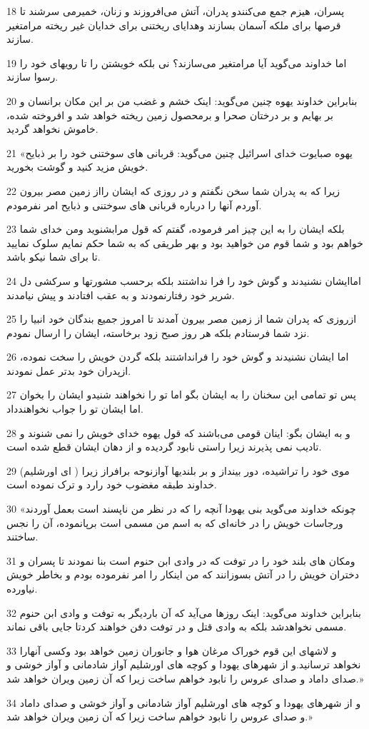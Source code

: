 \par 18 پسران، هیزم جمع می‌کنندو پدران، آتش می‌افروزند و زنان، خمیرمی سرشند تا قرصها برای ملکه آسمان بسازند وهدایای ریختنی برای خدایان غیر ریخته مرامتغیر سازند.
\par 19 اما خداوند می‌گوید آیا مرامتغیر می‌سازند؟ نی بلکه خویشتن را تا رویهای خود را رسوا سازند.
\par 20 بنابراین خداوند یهوه چنین می‌گوید: اینک خشم و غضب من بر این مکان برانسان و بر بهایم و بر درختان صحرا و برمحصول زمین ریخته خواهد شد و افروخته شده، خاموش نخواهد گردید.
\par 21 «یهوه صبایوت خدای اسرائیل چنین می‌گوید: قربانی های سوختنی خود را بر ذبایح خویش مزید کنید و گوشت بخورید.
\par 22 زیرا که به پدران شما سخن نگفتم و در روزی که ایشان رااز زمین مصر بیرون آوردم آنها را درباره قربانی های سوختنی و ذبایح امر نفرمودم.
\par 23 بلکه ایشان را به این چیز امر فرموده، گفتم که قول مرابشنوید ومن خدای شما خواهم بود و شما قوم من خواهید بود و بهر طریقی که به شما حکم نمایم سلوک نمایید تا برای شما نیکو باشد.
\par 24 اماایشان نشنیدند و گوش خود را فرا نداشتند بلکه برحسب مشورتها و سرکشی دل شریر خود رفتارنمودند و به عقب افتادند و پیش نیامدند.
\par 25 ازروزی که پدران شما از زمین مصر بیرون آمدند تا امروز جمیع بندگان خود انبیا را نزد شما فرستادم بلکه هر روز صبح زود برخاسته، ایشان را ارسال نمودم.
\par 26 اما ایشان نشنیدند و گوش خود را فرانداشتند بلکه گردن خویش را سخت نموده، ازپدران خود بدتر عمل نمودند.
\par 27 پس تو تمامی این سخنان را به ایشان بگو اما تو را نخواهند شنیدو ایشان را بخوان اما ایشان تو را جواب نخواهندداد.
\par 28 و به ایشان بگو: اینان قومی می‌باشند که قول یهوه خدای خویش را نمی شنوند و تادیب نمی پذیرند زیرا راستی نابود گردیده و از دهان ایشان قطع شده است.
\par 29 (ای اورشلیم ) موی خود را تراشیده، دور بینداز و بر بلندیها آوازنوحه برافراز زیرا خداوند طبقه مغضوب خود رارد و ترک نموده است.
\par 30 «چونکه خداوند می‌گوید بنی یهودا آنچه را که در نظر من ناپسند است بعمل آوردند ورجاسات خویش را در خانه‌ای که به اسم من مسمی است برپانموده، آن را نجس ساختند.
\par 31 ومکان های بلند خود را در توفت که در وادی ابن حنوم است بنا نمودند تا پسران و دختران خویش را در آتش بسوزانند که من اینکار را امر نفرموده بودم و بخاطر خویش نیاورده.
\par 32 بنابراین خداوند می‌گوید: اینک روزها می‌آید که آن باردیگر به توفت و وادی ابن حنوم مسمی نخواهدشد بلکه به وادی قتل و در توفت دفن خواهند کردتا جایی باقی نماند.
\par 33 و لاشهای این قوم خوراک مرغان هوا و جانوران زمین خواهد بود وکسی آنهارا نخواهد ترسانید.و از شهرهای یهودا و کوچه های اورشلیم آواز شادمانی و آواز خوشی و صدای داماد و صدای عروس را نابود خواهم ساخت زیرا که آن زمین ویران خواهد شد.»
\par 34 و از شهرهای یهودا و کوچه های اورشلیم آواز شادمانی و آواز خوشی و صدای داماد و صدای عروس را نابود خواهم ساخت زیرا که آن زمین ویران خواهد شد.»
 
